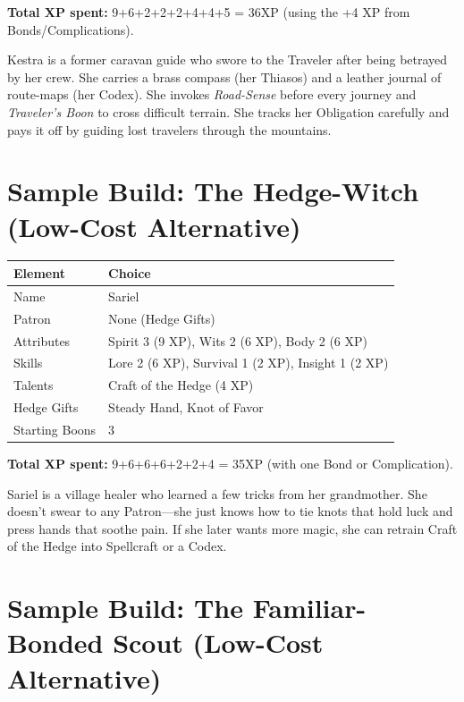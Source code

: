 \textbf{Total XP spent:} 9+6+2+2+2+4+4+5 = 36XP (using the +4 XP from Bonds/Complications).

\medskip
\noindent Kestra is a former caravan guide who swore to the Traveler after being betrayed by her crew. She carries a brass compass (her Thiasos) and a leather journal of route-maps (her Codex). She invokes \emph{Road-Sense} before every journey and \emph{Traveler's Boon} to cross difficult terrain. She tracks her Obligation carefully and pays it off by guiding lost travelers through the mountains.

\section{Sample Build: The Hedge-Witch (Low-Cost Alternative)}
\label{sec:sample-hedge-witch}

\begin{center}
\small
\renewcommand{\arraystretch}{1.1}
\begin{tabular}{ll}
\toprule
\textbf{Element} & \textbf{Choice} \\
\midrule
Name & Sariel \\
Patron & None (Hedge Gifts) \\
Attributes & Spirit 3 (9 XP), Wits 2 (6 XP), Body 2 (6 XP) \\
Skills & Lore 2 (6 XP), Survival 1 (2 XP), Insight 1 (2 XP) \\
Talents & Craft of the Hedge (4 XP) \\
Hedge Gifts & Steady Hand, Knot of Favor \\
Starting Boons & 3 \\
\bottomrule
\end{tabular}
\end{center}

\textbf{Total XP spent:} 9+6+6+6+2+2+4 = 35XP (with one Bond or Complication).

\medskip
\noindent Sariel is a village healer who learned a few tricks from her grandmother. She doesn't swear to any Patron---she just knows how to tie knots that hold luck and press hands that soothe pain. If she later wants more magic, she can retrain Craft of the Hedge into Spellcraft or a Codex.

\section{Sample Build: The Familiar-Bonded Scout (Low-Cost Alternative)}
\label{sec:sample-familiar-only}

